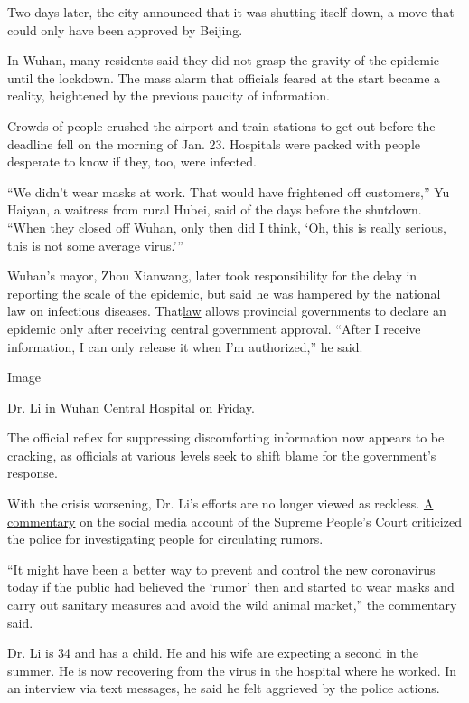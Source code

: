 Two days later, the city announced that it was shutting itself down, a
move that could only have been approved by Beijing.

In Wuhan, many residents said they did not grasp the gravity of the
epidemic until the lockdown. The mass alarm that officials feared at the
start became a reality, heightened by the previous paucity of
information.

Crowds of people crushed the airport and train stations to get out
before the deadline fell on the morning of Jan. 23. Hospitals were
packed with people desperate to know if they, too, were infected.

``We didn't wear masks at work. That would have frightened off
customers,'' Yu Haiyan, a waitress from rural Hubei, said of the days
before the shutdown. ``When they closed off Wuhan, only then did I
think, `Oh, this is really serious, this is not some average virus.'''

Wuhan's mayor, Zhou Xianwang, later took responsibility for the delay in
reporting the scale of the epidemic, but said he was hampered by the
national law on infectious diseases.
That\href{http://en.pkulaw.cn/display.aspx?cgid=221cc4a42d25144cbdfb\&lib=law}{law}
allows provincial governments to declare an epidemic only after
receiving central government approval. ``After I receive information, I
can only release it when I'm authorized,'' he said.

Image

Dr. Li in Wuhan Central Hospital on Friday.

The official reflex for suppressing discomforting information now
appears to be cracking, as officials at various levels seek to shift
blame for the government's response.

With the crisis worsening, Dr. Li's efforts are no longer viewed as
reckless. \href{https://mp.weixin.qq.com/s/ETgXN6HInzlC8cxzhDdU9g}{A
commentary} on the social media account of the Supreme People's Court
criticized the police for investigating people for circulating rumors.

``It might have been a better way to prevent and control the new
coronavirus today if the public had believed the `rumor' then and
started to wear masks and carry out sanitary measures and avoid the wild
animal market,'' the commentary said.

Dr. Li is 34 and has a child. He and his wife are expecting a second in
the summer. He is now recovering from the virus in the hospital where he
worked. In an interview via text messages, he said he felt aggrieved by
the police actions.

